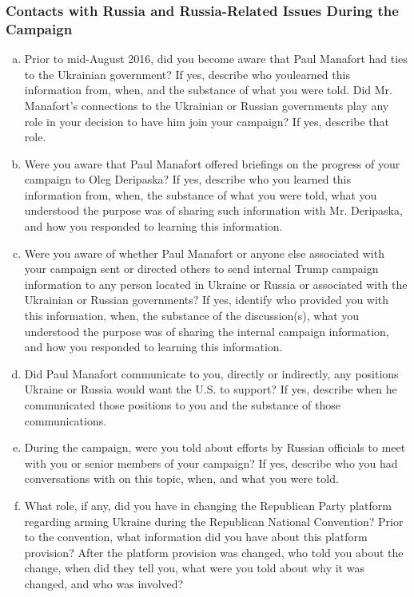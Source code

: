\subsubsection{Contacts with Russia and Russia-Related Issues During the Campaign}

\begin{enumerate}[a.]

\item Prior to mid-August 2016, did you become aware that Paul Manafort had ties to the Ukrainian government?
If yes, describe who youlearned this information from, when, and the substance of what you were told.
Did Mr. Manafort’s connections to the Ukrainian or Russian governments play any role in your decision to have him join your campaign?
If yes, describe that role.

\item Were you aware that Paul Manafort offered briefings on the progress of your campaign to Oleg Deripaska?
If yes, describe who you learned this information from, when, the substance of what you were told, what you understood the purpose was of sharing such information with Mr. Deripaska, and how you responded to learning this information.

\item Were you aware of whether Paul Manafort or anyone else associated with your campaign sent or directed others to send internal Trump campaign information to any person located in Ukraine or Russia or associated with the Ukrainian or Russian governments?
If yes, identify who provided you with this information, when, the substance of the discussion(s), what you understood the purpose was of sharing the internal campaign information, and how you responded to learning this information.

\item Did Paul Manafort communicate to you, directly or indirectly, any positions Ukraine or Russia would want the U.S. to support?
If yes, describe when he communicated those positions to you and the substance of those communications.

\item During the campaign, were you told about efforts by Russian officials to meet with you or senior members of your campaign?
If yes, describe who you had conversations with on this topic, when, and what you were told.

\item What role, if any, did you have in changing the Republican Party platform regarding arming Ukraine during the Republican National Convention?
Prior to the convention, what information did you have about this platform provision?
After the platform provision was changed, who told you about the change, when did they tell you, what were you told about why it was changed, and who was involved?


\end{enumerate}
